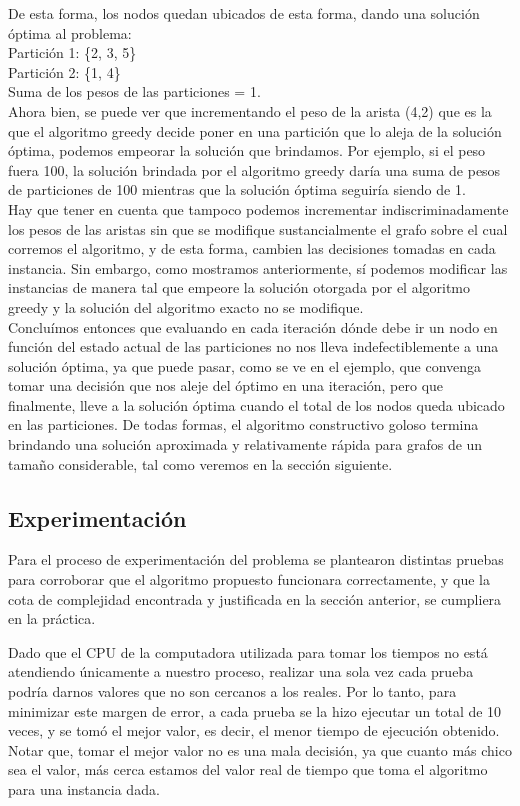 \noindent De esta forma, los nodos quedan ubicados de esta forma, dando una solución óptima al problema:\\
Partición 1: \{2, 3, 5\}\\
Partición 2: \{1, 4\}\\
Suma de los pesos de las particiones = 1.\\


Ahora bien, se puede ver que incrementando el peso de la arista (4,2) que es la que el algoritmo greedy decide poner en una partición que lo aleja de la solución óptima, podemos empeorar la solución que brindamos. Por ejemplo, si el peso fuera 100, la solución brindada por el algoritmo greedy daría una suma de pesos de particiones de 100 mientras que la solución óptima seguiría siendo de 1.\\
Hay que tener en cuenta que tampoco podemos incrementar indiscriminadamente los pesos de las aristas sin que se modifique sustancialmente el grafo sobre el cual corremos el algoritmo, y de esta forma, cambien las decisiones tomadas en cada instancia. Sin embargo, como mostramos anteriormente, sí podemos modificar las instancias de manera tal que empeore la solución otorgada por el algoritmo greedy y la solución del algoritmo exacto no se modifique.\\

Concluímos entonces que evaluando en cada iteración dónde debe ir un nodo en función del estado actual de las particiones no nos lleva indefectiblemente a una solución óptima, ya que puede pasar, como se ve en el ejemplo, que convenga tomar una decisión que nos aleje del óptimo en una iteración, pero que finalmente, lleve a la solución óptima cuando el total de los nodos queda ubicado en las particiones. De todas formas, el algoritmo constructivo goloso termina brindando una solución aproximada y relativamente rápida para grafos de un tamaño considerable, tal como veremos en la sección siguiente.\\


\subsection{Experimentación}

Para el proceso de experimentación del problema se plantearon distintas pruebas para corroborar que el algoritmo propuesto funcionara correctamente, y que la cota de complejidad encontrada y justificada en la sección anterior, se cumpliera en la práctica.

\noindent Dado que el CPU de la computadora utilizada para tomar los tiempos no está atendiendo únicamente a nuestro proceso, realizar una sola vez cada prueba podría darnos valores que no son cercanos a los reales. Por lo tanto, para minimizar este margen de error, a cada prueba se la hizo ejecutar un total de 10 veces, y se tomó el mejor valor, es decir, el menor tiempo de ejecución obtenido. Notar que, tomar el mejor valor no es una mala decisión, ya que cuanto más chico sea el valor, más cerca estamos del valor real de tiempo que toma el algoritmo para una instancia dada.\\

